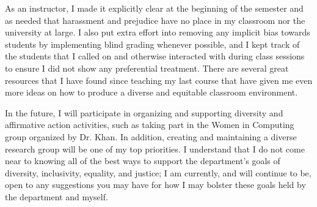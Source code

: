 As an instructor, I made it explicitly clear at the beginning of the semester and as needed that harassment and prejudice have no place in my classroom nor the university at large. I also put extra effort into removing any implicit bias towards students by implementing blind grading whenever possible, and I kept track of the students that I called on and otherwise interacted with during class sessions to ensure I did not show any preferential treatment. There are several great resources that I have found since teaching my last course that have given me even more ideas on how to produce a diverse and equitable classroom environment.

In the future, I will participate in organizing and supporting diversity and affirmative action activities, such as taking part in the Women in Computing group organized by Dr. Khan. In addition, creating and maintaining a diverse research group will be one of my top priorities. I understand that I do not come near to knowing all of the best ways to support the department’s goals of diversity, inclusivity, equality, and justice; I am currently, and will continue to be, open to any suggestions you may have for how I may bolster these goals held by the department and myself.


\label{diversity_last}